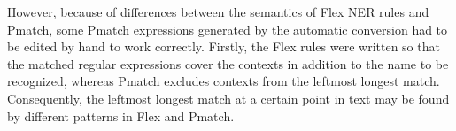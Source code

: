\documentclass{llncs}
\begin{document}

However, because of differences between the semantics of Flex NER
rules and Pmatch, some Pmatch expressions generated by the automatic
conversion had to be edited by hand to work correctly. Firstly, the
Flex rules were written so that the matched regular expressions cover
the contexts in addition to the name to be recognized, whereas Pmatch
excludes contexts from the leftmost longest match. Consequently, the
leftmost longest match at a certain point in text may be found by
different patterns in Flex and Pmatch.

\end{document}
